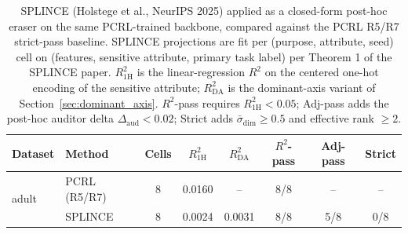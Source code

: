\begin{table}[t]
\centering
\small
\begin{tabular}{l l c c c c c c}
\toprule
Dataset & Method & Cells & $R^2_{\text{1H}}$ & $R^2_{\text{DA}}$ & $R^2$-pass & Adj-pass & Strict \\
\midrule
\multirow{2}{*}{adult} & PCRL (R5/R7) & 8 & 0.0160 & -- & 8/8 & -- & -- \\
& SPLINCE & 8 & 0.0024 & 0.0031 & 8/8 & 5/8 & 0/8 \\
\bottomrule
\end{tabular}
\caption{SPLINCE (Holstege et al., NeurIPS 2025) applied as a closed-form post-hoc eraser on the same PCRL-trained backbone, compared against the PCRL R5/R7 strict-pass baseline. SPLINCE projections are fit per (purpose, attribute, seed) cell on (features, sensitive attribute, primary task label) per Theorem 1 of the SPLINCE paper. $R^2_{\text{1H}}$ is the linear-regression $R^2$ on the centered one-hot encoding of the sensitive attribute; $R^2_{\text{DA}}$ is the dominant-axis variant of Section~\ref{sec:dominant_axis}. $R^2$-pass requires $R^2_{\text{1H}} < 0.05$; Adj-pass adds the post-hoc auditor delta $\Delta_{\text{aud}} < 0.02$; Strict adds $\bar{\sigma}_{\text{dim}} \geq 0.5$ and effective rank $\geq 2$.}
\label{tab:splince_vs_pcrl}
\end{table}
